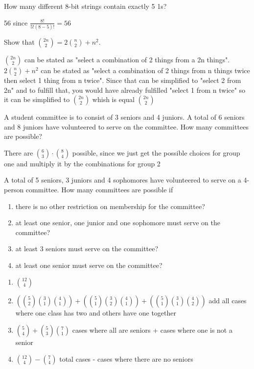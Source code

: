 \documentclass{homework}
\begin{document}
\question How many different 8-bit strings contain exactly 5 1s?

\begin{sol}
  56 since $\frac{8!}{5!(8-5)!}=56$
\end{sol}

\question Show that $\binom{2n}{2} =2\binom{n}{2} + n^2$.

\begin{sol}
  $\binom{2n}{2}$ can be stated as "select a combination of 2 things from a 2n things". $2\binom{n}{2}+n^{2}$ can be stated as "select a combination of 2 things from n things twice then select 1 thing from n twice". Since that can be simplified to "select 2 from 2n" and to fulfill that, you would have already fulfilled "select 1 from n twice" so it can be simplified to $\binom{2n}{2}$ whish is equal $\binom{2n}{2}$
\end{sol}

\question A student committee is to consist of 3 seniors and 4 juniors. A total of 6 seniors and 8 juniors have volunteered to serve on the committee. How many committees are possible?

\begin{sol}
  There are $\binom{6}{3} \cdot \binom{8}{4}$ possible, since we just get the possible choices for group one and multiply it by the combinations for group 2
\end{sol}

\question A total of 5 seniors, 3 juniors and 4 sophomores have volunteered to serve on a 4-person committee. How many committees are possible if
\begin{enumerate}[label=(\alph*)]
    \item there is no other restriction on membership for the committee?
    \item at least one senior, one junior and one sophomore must serve on the committee?
    \item at least 3 seniors must serve on the committee?
    \item at least one senior must serve on the committee?
\end{enumerate}

\begin{sol}
  \begin{enumerate}[label=(\alph*)]
    \item $\binom{12}{4}$
    \item $(\binom{5}{2}\binom{3}{1}\binom{4}{1}) + (\binom{5}{1}\binom{3}{2}\binom{4}{1}) + (\binom{5}{1}\binom{3}{1}\binom{4}{2})$ add all cases where one class has two and others have one together
    \item $\binom{5}{4}+\binom{5}{3}\binom{7}{1}$ cases where all are seniors + cases where one is not a senior
    \item $\binom{12}{4}-\binom{7}{4}$ total cases - cases where there are no seniors
  \end{enumerate}
\end{sol}
\end{document}
